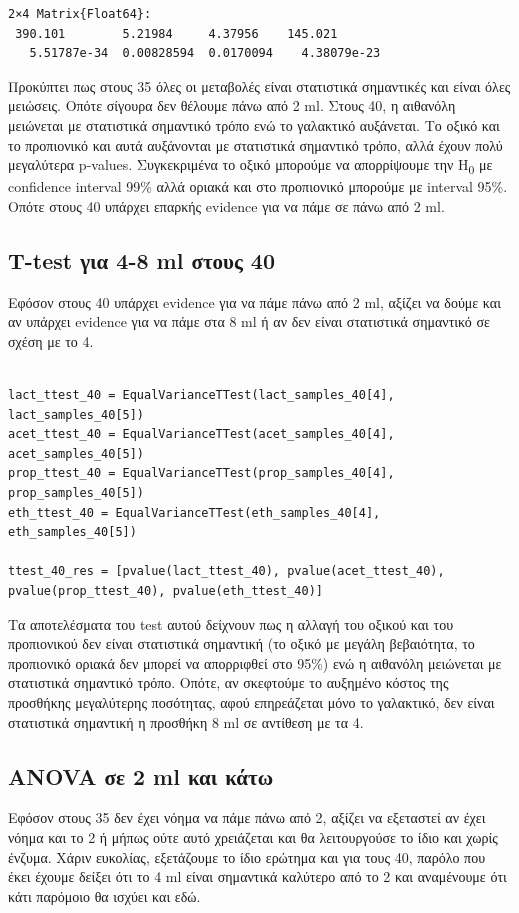 \documentclass[11pt]{article}
\begin{document}
\begin{verbatim}
2×4 Matrix{Float64}:
 390.101        5.21984     4.37956    145.021
   5.51787e-34  0.00828594  0.0170094    4.38079e-23
\end{verbatim}


Προκύπτει πως στους 35 όλες οι μεταβολές είναι στατιστικά σημαντικές και είναι όλες μειώσεις. Οπότε σίγουρα δεν θέλουμε πάνω από 2 ml. Στους 40, η αιθανόλη μειώνεται με στατιστικά σημαντικό τρόπο ενώ το γαλακτικό αυξάνεται. Το οξικό και το προπιονικό και αυτά αυξάνονται με στατιστικά σημαντικό τρόπο, αλλά έχουν πολύ μεγαλύτερα p-values. Συγκεκριμένα το οξικό μπορούμε να απορρίψουμε την H\textsubscript{0} με confidence interval 99\% αλλά οριακά και στο προπιονικό μπορούμε με interval 95\%. Οπότε στους 40 υπάρχει επαρκής evidence για να πάμε σε πάνω από 2 ml.

\subsection{T-test για 4-8 ml στους 40}
\label{sec:org3c66a4c}
Εφόσον στους 40 υπάρχει evidence για να πάμε πάνω από 2 ml, αξίζει να δούμε και αν υπάρχει evidence για να πάμε στα 8 ml ή αν δεν είναι στατιστικά σημαντικό σε σχέση με το 4.

\begin{verbatim}

lact_ttest_40 = EqualVarianceTTest(lact_samples_40[4], lact_samples_40[5])
acet_ttest_40 = EqualVarianceTTest(acet_samples_40[4], acet_samples_40[5])
prop_ttest_40 = EqualVarianceTTest(prop_samples_40[4], prop_samples_40[5])
eth_ttest_40 = EqualVarianceTTest(eth_samples_40[4], eth_samples_40[5])

ttest_40_res = [pvalue(lact_ttest_40), pvalue(acet_ttest_40), pvalue(prop_ttest_40), pvalue(eth_ttest_40)]
\end{verbatim}

Τα αποτελέσματα του test αυτού δείχνουν πως η αλλαγή του οξικού και του προπιονικού δεν είναι στατιστικά σημαντική (το οξικό με μεγάλη βεβαιότητα, το προπιονικό οριακά δεν μπορεί να απορριφθεί στο 95\%) ενώ η αιθανόλη μειώνεται με στατιστικά σημαντικό τρόπο. Οπότε, αν σκεφτούμε το αυξημένο κόστος της προσθήκης μεγαλύτερης ποσότητας, αφού επηρεάζεται μόνο το γαλακτικό, δεν είναι στατιστικά σημαντική η προσθήκη 8 ml σε αντίθεση με τα 4.

\subsection{ANOVA σε 2 ml και κάτω}
\label{sec:org99a5739}
Εφόσον στους 35 δεν έχει νόημα να πάμε πάνω από 2, αξίζει να εξεταστεί αν έχει νόημα και το 2 ή μήπως ούτε αυτό χρειάζεται και θα λειτουργούσε το ίδιο και χωρίς ένζυμα. Χάριν ευκολίας, εξετάζουμε το ίδιο ερώτημα και για τους 40, παρόλο που έκει έχουμε δείξει ότι το 4 ml είναι σημαντικά καλύτερο από το 2 και αναμένουμε ότι κάτι παρόμοιο θα ισχύει και εδώ.
\end{document}
